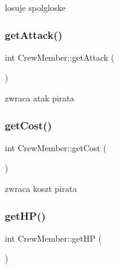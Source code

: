 losuje spolgloske 

\mbox{\label{class_crew_member_aa3af9da6005c0cde36e91ebac14ff833}} 
\subsubsection{\texorpdfstring{get\+Attack()}{getAttack()}}
{\footnotesize\ttfamily int Crew\+Member\+::get\+Attack (\begin{DoxyParamCaption}{ }\end{DoxyParamCaption})\hspace{0.3cm}{\ttfamily [inline]}}



zwraca atak pirata 

\mbox{\label{class_crew_member_a72be72a3277cb26d86e67687c46e3b3f}} 
\subsubsection{\texorpdfstring{get\+Cost()}{getCost()}}
{\footnotesize\ttfamily int Crew\+Member\+::get\+Cost (\begin{DoxyParamCaption}{ }\end{DoxyParamCaption})\hspace{0.3cm}{\ttfamily [inline]}}



zwraca koszt pirata 

\mbox{\label{class_crew_member_aae0cd068de1105bf494869b3ad1c7bbd}} 
\subsubsection{\texorpdfstring{get\+H\+P()}{getHP()}}
{\footnotesize\ttfamily int Crew\+Member\+::get\+HP (\begin{DoxyParamCaption}{ }\end{DoxyParamCaption})\hspace{0.3cm}{\ttfamily [inline]}}



